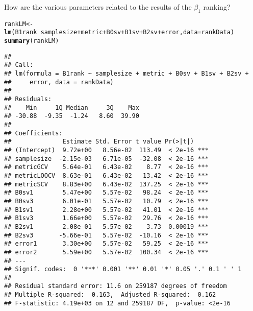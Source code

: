 \documentclass{article}\usepackage[]{graphicx}\usepackage[]{color}
\makeatletter
\newcommand{\hlopt}[1]{\textcolor[rgb]{0,0,0}{#1}}%
\newcommand{\hlstd}[1]{\textcolor[rgb]{0.345,0.345,0.345}{#1}}%
\newcommand{\hlkwb}[1]{\textcolor[rgb]{0.69,0.353,0.396}{#1}}%
\newcommand{\hlkwc}[1]{\textcolor[rgb]{0.333,0.667,0.333}{#1}}%
\newcommand{\hlkwd}[1]{\textcolor[rgb]{0.737,0.353,0.396}{\textbf{#1}}}%
\newenvironment{kframe}{%
 \def\at@end@of@kframe{}%
 \ifinner\ifhmode%
  \def\at@end@of@kframe{\end{minipage}}%
  \begin{minipage}{\columnwidth}%
 \fi\fi%
 \def\FrameCommand##1{\hskip\@totalleftmargin \hskip-\fboxsep
 \colorbox{shadecolor}{##1}\hskip-\fboxsep
     \hskip-\linewidth \hskip-\@totalleftmargin \hskip\columnwidth}%
 \MakeFramed {\advance\hsize-\width
   \@totalleftmargin\z@ \linewidth\hsize
   \@setminipage}}%
 {\par\unskip\endMakeFramed%
 \at@end@of@kframe}
\newenvironment{knitrout}{}{} %
\makeatother
\begin{document}
How are the various parameters related to the results of the $\beta _1$ ranking?
\begin{knitrout}
\color{fgcolor}\begin{kframe}
\begin{alltt}
\hlstd{rankLM} \hlkwb{<-} \hlkwd{lm}\hlstd{(B1rank} \hlopt{~} \hlstd{samplesize} \hlopt{+} \hlstd{metric} \hlopt{+} \hlstd{B0sv} \hlopt{+} \hlstd{B1sv} \hlopt{+} \hlstd{B2sv} \hlopt{+} \hlstd{error,} \hlkwc{data} \hlstd{= rankData)}
\hlkwd{summary}\hlstd{(rankLM)}
\end{alltt}
\begin{verbatim}
## 
## Call:
## lm(formula = B1rank ~ samplesize + metric + B0sv + B1sv + B2sv + 
##     error, data = rankData)
## 
## Residuals:
##    Min     1Q Median     3Q    Max 
## -30.88  -9.35  -1.24   8.60  39.90 
## 
## Coefficients:
##              Estimate Std. Error t value Pr(>|t|)    
## (Intercept)  9.72e+00   8.56e-02  113.49  < 2e-16 ***
## samplesize  -2.15e-03   6.71e-05  -32.08  < 2e-16 ***
## metricGCV    5.64e-01   6.43e-02    8.77  < 2e-16 ***
## metricLOOCV  8.63e-01   6.43e-02   13.42  < 2e-16 ***
## metricSCV    8.83e+00   6.43e-02  137.25  < 2e-16 ***
## B0sv1        5.47e+00   5.57e-02   98.24  < 2e-16 ***
## B0sv3        6.01e-01   5.57e-02   10.79  < 2e-16 ***
## B1sv1        2.28e+00   5.57e-02   41.01  < 2e-16 ***
## B1sv3        1.66e+00   5.57e-02   29.76  < 2e-16 ***
## B2sv1        2.08e-01   5.57e-02    3.73  0.00019 ***
## B2sv3       -5.66e-01   5.57e-02  -10.16  < 2e-16 ***
## error1       3.30e+00   5.57e-02   59.25  < 2e-16 ***
## error2       5.59e+00   5.57e-02  100.34  < 2e-16 ***
## ---
## Signif. codes:  0 '***' 0.001 '**' 0.01 '*' 0.05 '.' 0.1 ' ' 1
## 
## Residual standard error: 11.6 on 259187 degrees of freedom
## Multiple R-squared:  0.163,	Adjusted R-squared:  0.162 
## F-statistic: 4.19e+03 on 12 and 259187 DF,  p-value: <2e-16
\end{verbatim}
\end{kframe}
\end{knitrout}
\end{document}
